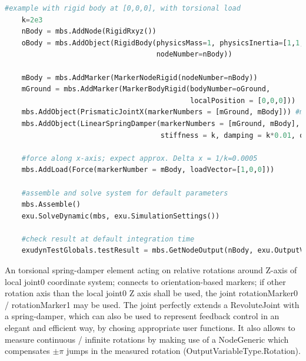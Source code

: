 \begin{lstlisting}[language=Python, firstnumber=1]
    #example with rigid body at [0,0,0], with torsional load
    k=2e3
    nBody = mbs.AddNode(RigidRxyz())
    oBody = mbs.AddObject(RigidBody(physicsMass=1, physicsInertia=[1,1,1,0,0,0], 
                                    nodeNumber=nBody))
    
    mBody = mbs.AddMarker(MarkerNodeRigid(nodeNumber=nBody))
    mGround = mbs.AddMarker(MarkerBodyRigid(bodyNumber=oGround, 
                                            localPosition = [0,0,0]))
    mbs.AddObject(PrismaticJointX(markerNumbers = [mGround, mBody])) #motion along ground X-axis
    mbs.AddObject(LinearSpringDamper(markerNumbers = [mGround, mBody], axisMarker0=[1,0,0],
                                     stiffness = k, damping = k*0.01, offset = 0))

    #force along x-axis; expect approx. Delta x = 1/k=0.0005
    mbs.AddLoad(Force(markerNumber = mBody, loadVector=[1,0,0])) 

    #assemble and solve system for default parameters
    mbs.Assemble()
    exu.SolveDynamic(mbs, exu.SimulationSettings())
    
    #check result at default integration time
    exudynTestGlobals.testResult = mbs.GetNodeOutput(nBody, exu.OutputVariableType.Displacement)[0]
\end{lstlisting}

\newpage


\label{sec:item:ObjectConnectorTorsionalSpringDamper}
An torsional spring-damper element acting on relative rotations around Z-axis of local joint0 coordinate system; connects to orientation-based markers; if other rotation axis than the local joint0 Z axis shall be used, the joint rotationMarker0 / rotationMarker1 may be used. The joint perfectly extends a RevoluteJoint with a spring-damper, which can also be used to represent feedback control in an elegant and efficient way, by chosing appropriate user functions. It also allows to measure continuous / infinite rotations by making use of a NodeGeneric which compensates $\pm \pi$ jumps in the measured rotation (OutputVariableType.Rotation).
\vspace{12pt}\\

